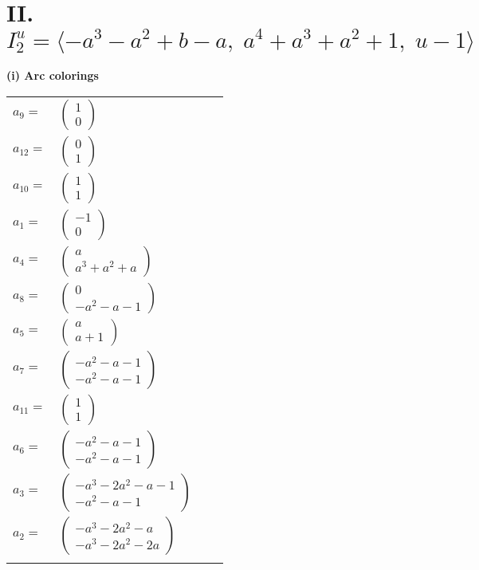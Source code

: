 \documentclass[1p]{elsarticle_modified}
\theoremstyle{definition}
\begin{document}
\centering \section*{II. $I^u_{2}= \langle - a^3- a^2+b- a,\;a^4+a^3+a^2+1,\;u-1 \rangle$}
\flushleft \textbf{(i) Arc colorings}\\
\begin{tabular}{m{7pt} m{180pt} m{7pt} m{180pt} }
\flushright $a_{9}=$&$\begin{pmatrix}1\\0\end{pmatrix}$ \\
\flushright $a_{12}=$&$\begin{pmatrix}0\\1\end{pmatrix}$ \\
\flushright $a_{10}=$&$\begin{pmatrix}1\\1\end{pmatrix}$ \\
\flushright $a_{1}=$&$\begin{pmatrix}-1\\0\end{pmatrix}$ \\
\flushright $a_{4}=$&$\begin{pmatrix}a\\a^3+a^2+a\end{pmatrix}$ \\
\flushright $a_{8}=$&$\begin{pmatrix}0\\- a^2- a-1\end{pmatrix}$ \\
\flushright $a_{5}=$&$\begin{pmatrix}a\\a+1\end{pmatrix}$ \\
\flushright $a_{7}=$&$\begin{pmatrix}- a^2- a-1\\- a^2- a-1\end{pmatrix}$ \\
\flushright $a_{11}=$&$\begin{pmatrix}1\\1\end{pmatrix}$ \\
\flushright $a_{6}=$&$\begin{pmatrix}- a^2- a-1\\- a^2- a-1\end{pmatrix}$ \\
\flushright $a_{3}=$&$\begin{pmatrix}- a^3-2 a^2- a-1\\- a^2- a-1\end{pmatrix}$ \\
\flushright $a_{2}=$&$\begin{pmatrix}- a^3-2 a^2- a\\- a^3-2 a^2-2 a\end{pmatrix}$\\&\end{tabular}
\end{document}
